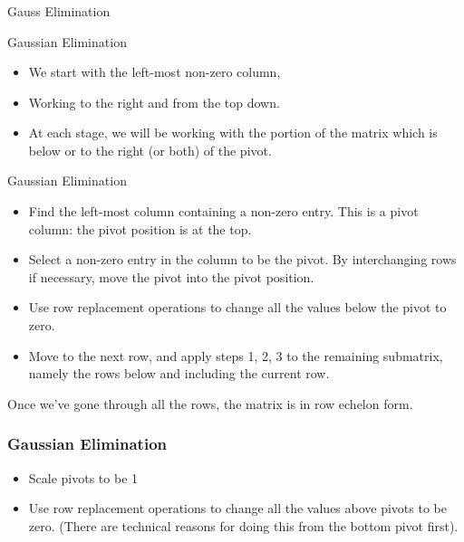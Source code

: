   \begin{frame}[fragile]\frametitle{}
\begin{center}
{\Large Gauss Elimination }
\end{center}
\end{frame}


  \begin{frame}[fragile]{Gaussian Elimination}
\begin{itemize} 
\item We start with the left-most
non-zero column,
\item Working to the right and from the top down.  
\item At 
each stage, we will be working with the portion of the matrix which 
is below or to the right (or both) of the pivot.
\end{itemize}
\end{frame}

  \begin{frame}[fragile]{Gaussian Elimination}
\begin{itemize} 
\item Find the left-most column containing a non-zero entry.  This is 
a pivot column: the pivot position is at the top.   
\item Select a non-zero entry in the column to be the pivot. By 
interchanging rows if necessary, move the pivot into the pivot position.  
\item Use row replacement operations to change all the values below the pivot
to zero.  
\item Move to the next row, and apply steps 1, 2, 3 to the remaining
submatrix, namely the rows below and including the current row.
\end{itemize}

Once we've gone through all the rows, the matrix is in row echelon form.
\end{frame}


  \begin{frame}[fragile]\frametitle{Gaussian Elimination}

\begin{itemize}   
\item Scale pivots to be 1 
\item Use row replacement operations to change all the values above 
pivots to be zero.  (There are technical reasons for doing this from the 
bottom pivot first).
\end{itemize}
\end{frame}



